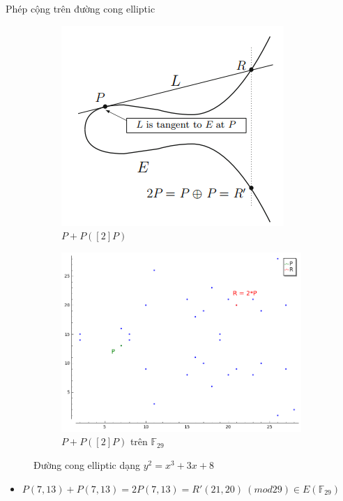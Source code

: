 \documentclass[compress]{beamer}
\begin{document}
\begin{frame}{Phép cộng trên đường cong elliptic}
\begin{figure}[h]
\begin{subfigure}{.5\textwidth}
  \centering
  \includegraphics[width=0.85\linewidth]{../im3.png}
  \caption{$P + P ([2]P)$}
  \label{fig:sfig1}
\end{subfigure}%
\begin{subfigure}{.5\textwidth}
  \centering
  \includegraphics[width=1\linewidth]{../im14.png}
  \caption{$P + P ([2]P)$ trên $\mathbb{F}_{29}$}
  \label{fig:sfig2}
\end{subfigure}
\caption*{Đường cong elliptic dạng $y^2 = x^3 + 3x + 8$}
\label{fig:fig}
\end{figure}
\begin{itemize}
\item \small{$P(7 ,13) + P(7, 13) = 2P(7, 13) = R'(21, 20) \ (mod 29) \in E(\mathbb{F}_{29})$}
\end{itemize}
\end{frame}
\end{document}
